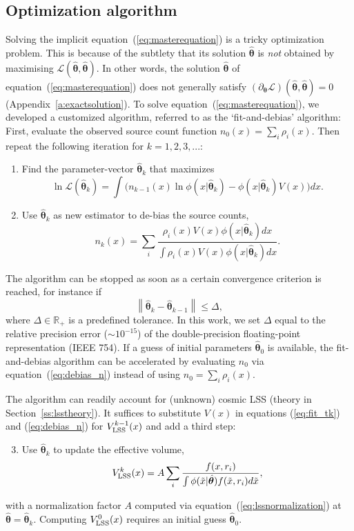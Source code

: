 \documentclass[a4paper,fleqn,usenatbib]{mnras}
\newcommand{\be}{\begin{equation}}
\newcommand{\ee}{\end{equation}}
\newcommand{\dx}{dx}
\newcommand{\veff}{V}%
\newcommand{\vefflss}{V_{\rm LSS}}%
\renewcommand{\L}{\mathcal{L}}
\newcommand{\eq}[1]{equation~(\ref{eq:#1})}
\renewcommand{\ss}[1]{Section~\ref{ss:#1}}
\renewcommand{\a}[1]{Appendix~\ref{a:#1}}
\newcommand{\para}{{\bm{\theta}}}
\begin{document}
\subsection{Optimization algorithm}\label{ss:alg}

Solving the implicit \eq{masterequation} is a tricky optimization problem. This is because of the subtlety that its solution $\hat\para$ is \emph{not} obtained by maximising $\L(\hat\para,\hat\para)$. In other words, the solution $\hat\para$ of \eq{masterequation} does not generally satisfy $(\partial_\para\L)(\hat\para,\hat\para)=0$ (\a{exactsolution}). To solve \eq{masterequation}, we developed a customized algorithm, referred to as the `fit-and-debias' algorithm: First, evaluate the observed source count function $n_0(x)=\sum_i\rho_i(x)$. Then repeat the following iteration for $k=1,2,3,...$:

\begin{enumerate}[leftmargin=7mm]
\setlength{\itemindent}{-1.6mm}
\item Find the parameter-vector $\hat\para_k$ that maximizes
\be\label{eq:fit_tk}
	\ln \L(\hat\para_k) = \int\Big(n_{k-1}(x)\ln\phi(x|\hat\para_k)-\phi(x|\hat\para_k)\veff(x)\Big)\dx.
\ee
\item Use $\hat\para_k$ as new estimator to de-bias the source counts,
\be\label{eq:debias_n}
	n_{k}(x) = \sum_i \frac{\rho_i(x)\veff(x)\phi(x|\hat\para_k)\dx}{\int\rho_i(x)\veff(x)\phi(x|\hat\para_k)\dx}.
\ee
\end{enumerate}

The algorithm can be stopped as soon as a certain convergence criterion is reached, for instance if
%
\be
	\left\|\hat\para_{k}-\hat\para_{k-1}\right\|\leq\Delta,
\ee
%
where $\Delta\in\mathbb{R}_+$ is a predefined tolerance. In this work, we set $\Delta$ equal to the relative precision error ($\sim10^{-15}$) of the double-precision floating-point representation (IEEE 754). If a guess of initial parameters $\hat\para_0$ is available, the fit-and-debias algorithm can be accelerated by evaluating $n_0$ via \eq{debias_n} instead of using $n_0=\sum_i\rho_i(x)$.

The algorithm can readily account for (unknown) cosmic LSS (theory in \ss{lsstheory}). It suffices to substitute $V(x)$ in equations (\ref{eq:fit_tk}) and (\ref{eq:debias_n}) for $\vefflss^{k-1}(x)$ and add a third step:
%
\begin{enumerate}[leftmargin=7mm]
\setlength{\itemindent}{-1.6mm}
\setcounter{enumi}{2}
\item Use $\hat\para_k$ to update the effective volume,
\be
	\vefflss^{k}(x) = A\sum_i\frac{f(x,r_i)}{\int\phi(\tilde x|\hat\para)f(\tilde x,r_i)d\tilde x},
\ee
\end{enumerate}
%
with a normalization factor $A$ computed via \eq{lssnormalization} at $\hat\para=\hat\para_k$. Computing  $\vefflss^{0}(x)$ requires an initial guess $\hat\para_0$.
\end{document}
